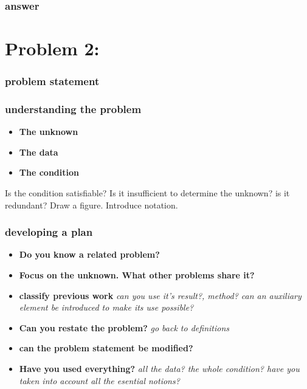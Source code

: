 \documentclass[11pt]{article}
\begin{document}
\subsubsection*{answer}


\section*{Problem 2:}

\subsubsection*{problem statement}

\subsubsection*{understanding the problem}

\begin{itemize}
 \item \textbf{The unknown}
 \item \textbf{The data} 
 \item \textbf{The condition} 
\end{itemize}

Is the condition satisfiable? Is it insufficient to determine the unknown? is it redundant?
Draw a figure. Introduce notation.

\subsubsection*{developing a plan}

\begin{itemize}
 \item \textbf{Do you know a related problem?}
 \item \textbf{Focus on the unknown. What other problems share it?}
 \item \textbf{classify previous work} \textit{can you use it's result?, method? can an auxiliary element be introduced to make its use possible?}
 \item \textbf{Can you restate the problem?} \textit{go back to definitions}
 \item \textbf{can the problem statement be modified?}
 \item \textbf{Have you used everything?} \textit{all the data? the whole condition? have you taken into account all the esential notions?}
\end{itemize}
\end{document}
